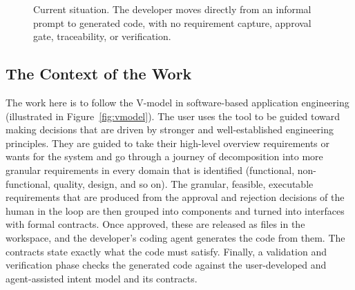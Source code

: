 \documentclass[12pt]{article}
\begin{document}
\begin{figure}[htbp]
\centering
{}
\caption{Current situation. The developer moves directly from an informal prompt
to generated code, with no requirement capture, approval gate, traceability, or
verification.}
\label{fig:current}
\end{figure}

\subsection{The Context of the Work}
The work here is to follow the V-model in software-based application engineering
(illustrated in Figure~\ref{fig:vmodel}). The user uses the tool
to be guided toward making decisions that are driven by stronger and
well-established engineering principles. They are guided to take their
high-level overview requirements or wants for the system and go through a
journey of decomposition into more granular requirements in every domain that is
identified (functional, non-functional, quality, design, and so on).
The granular, feasible, executable requirements that are produced from the
approval and rejection decisions of the human in the loop are then grouped into
components and turned into interfaces with formal contracts. Once approved, these
are released as files in the workspace, and the developer's coding agent
generates the code from them. The contracts state exactly what the code must
satisfy. Finally, a validation and
verification phase checks the generated code against the user-developed and
agent-assisted intent model and its contracts.
\end{document}
